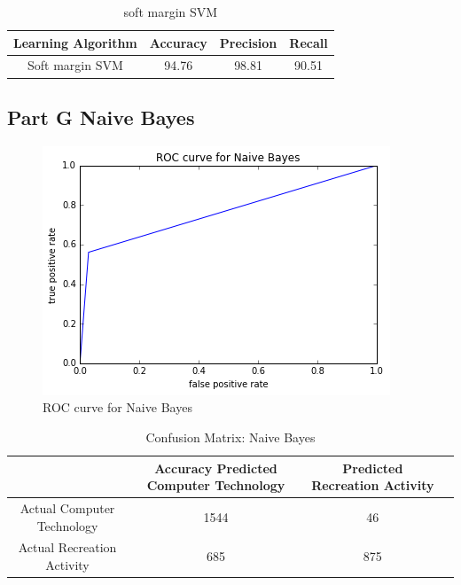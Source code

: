 \documentclass[11pt]{article}
\begin{document}
\begin{table}[h]
	\centering
	\begin{tabular}{|c|c|c|c|} \hline
		Learning Algorithm & Accuracy & Precision & Recall\\ \hline
		Soft margin SVM & 94.76 & 98.81 & 90.51 \\
		\hline
	\end{tabular}
	\caption{soft margin SVM}
	\label{table:ovr_res}
\end{table}

\subsection{Part G Naive Bayes}

\begin{figure}[h]
	
	\includegraphics[width=\textwidth]{ROC_NaiveBayes.png}
	\caption{ROC curve for Naive Bayes}
\end{figure}

\begin{table}[h]
	\centering
	\begin{tabular}{|c|c|c|c|} \hline
		& Accuracy 		Predicted Computer Technology & Predicted Recreation Activity \\ \hline
		Actual Computer Technology & 1544 & 46 \\
		Actual Recreation Activity & 685& 875  \\
		\hline
	\end{tabular}
	\caption{Confusion Matrix: Naive Bayes}
	\label{table:ovr_res}
\end{table}
\end{document}
